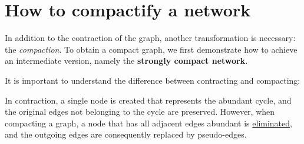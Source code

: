 \section{How to compactify a network}

    In addition to the contraction of the graph, another transformation is necessary: the \textit{compaction}. To obtain a compact graph, we first demonstrate how to achieve an intermediate version, namely the \textbf{strongly compact network}.

    It is important to understand the difference between contracting and compacting:

    In contraction, a single node is created that represents the abundant cycle, and the original edges not belonging to the cycle are preserved. However, when compacting a graph, a node that has all adjacent edges abundant is \underline{eliminated}, and the outgoing edges are consequently replaced by pseudo-edges.

